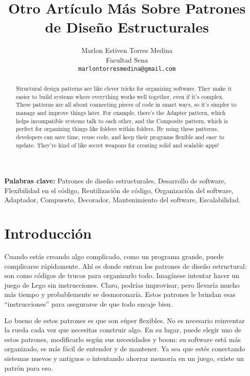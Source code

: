 \documentclass[12pt]{article}
\title{Otro Artículo Más Sobre Patrones de Diseño Estructurales}
\author{Marlon Estiven Torres Medina \\ Facultad Sena \\ \texttt{marlontorresmedina@gmail.com}}
\date{}
\begin{document}
\maketitle

\begin{abstract}
Structural design patterns are like clever tricks for organizing software. They make it easier to build systems where everything works well together, even if it's complex. These patterns are all about connecting pieces of code in smart ways, so it's simpler to manage and improve things later. For example, there's the Adapter pattern, which helps incompatible systems talk to each other, and the Composite pattern, which is perfect for organizing things like folders within folders. By using these patterns, developers can save time, reuse code, and keep their programs flexible and easy to update. They’re kind of like secret weapons for creating solid and scalable apps!
\end{abstract}

\textbf{Palabras clave:} Patrones de diseño estructurales, Desarrollo de software, Flexibilidad en el código, Reutilización de código, Organización del software, Adaptador, Compuesto, Decorador, Mantenimiento del software, Escalabilidad.

\section*{Introducción}
Cuando estás creando algo complicado, como un programa grande, puede complicarse rápidamente. Ahí es donde entran los patrones de diseño estructural: son como códigos de trucos para organizarlo todo. Imagínese intentar hacer un juego de Lego sin instrucciones. Claro, podrías improvisar, pero llevaría mucho más tiempo y probablemente se desmoronaría. Estos patrones le brindan esas ``instrucciones'' para asegurarse de que todo encaje bien.

Lo bueno de estos patrones es que son súper flexibles. No es necesario reinventar la rueda cada vez que necesitas construir algo. En su lugar, puede elegir uno de estos patrones, modificarlo según sus necesidades y boom: su software está más organizado, es más fácil de entender y de mantener. Ya sea que estés conectando sistemas nuevos y antiguos o intentando ahorrar memoria en un juego, existe un patrón para eso.
\end{document}
